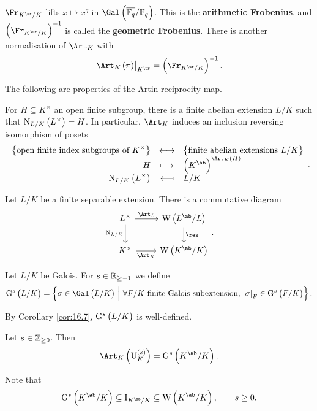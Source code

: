 \begin{remark*}
$ \Fr_{K^{\ur} / K} $ lifts $ x \mapsto x^q $ in $ \Gal\br{\overline{\FF_q} / \FF_q} $. This is the \textbf{arithmetic Frobenius}, and $ \br{\Fr_{K^{\ur} / K}}^{-1} $ is called the \textbf{geometric Frobenius}. There is another normalisation of $ \Art_K $ with
$$ \eval{\Art_K\br{\pi}}_{K^{\ur}} = \br{\Fr_{K^{\ur} / K}}^{-1}. $$
\end{remark*}

The following are properties of the Artin reciprocity map.

\begin{theorem}
For $ H \subseteq K^\times $ an open finite subgroup, there is a finite abelian extension $ L / K $ such that $ \N_{L / K}\br{L^\times} = H $. In particular, $ \Art_K $ induces an inclusion reversing isomorphism of posets
$$ \bijection{\cbr{\text{open finite index subgroups of} \ K^\times}}{\cbr{\text{finite abelian extensions} \ L / K}}{H}{\br{K^{\ab}}^{\Art_K\br{H}}}{\N_{L / K}\br{L^\times}}{L / K}. $$
\end{theorem}

\pagebreak

\begin{theorem}
Let $ L / K $ be a finite separable extension. There is a commutative diagram
$$
\begin{tikzcd}
L^\times \arrow{r}{\Art_L} \arrow{d}[swap]{\N_{L / K}} & \W\br{L^{\ab} / L} \arrow{d}{\res} \\
K^\times \arrow{r}[swap]{\Art_K} & \W\br{K^{\ab} / K}
\end{tikzcd}.
$$
\end{theorem}

\begin{definition}
Let $ L / K $ be Galois. For $ s \in \mathbb{R}_{\ge -1} $ we define
$$ \G^s\br{L / K} = \cbr{\sigma \in \Gal\br{L / K} \st \forall F / K \ \text{finite Galois subextension}, \ \eval{\sigma}_F \in \G^s\br{F / K}}. $$
\end{definition}

By Corollary \ref{cor:16.7}, $ \G^s\br{L / K} $ is well-defined.

\begin{theorem}
Let $ s \in \mathbb{Z}_{\ge 0} $. Then
$$ \Art_K\br{\U_K^{\br{s}}} = \G^s\br{K^{\ab} / K}. $$
\end{theorem}

Note that
$$ \G^s\br{K^{\ab} / K} \subseteq \I_{K^{\ab} / K} \subseteq \W\br{K^{\ab} / K}, \qquad s \ge 0. $$


